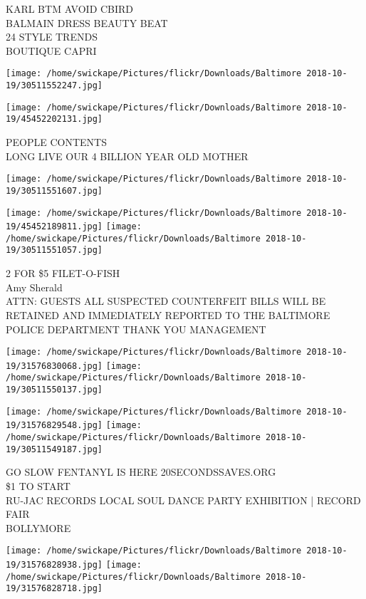 \documentclass[10pt,letterpaper]{article}
\begin{document}
KARL BTM AVOID CBIRD\\
BALMAIN DRESS BEAUTY BEAT\\
24 STYLE TRENDS\\
BOUTIQUE CAPRI\\
\pagebreak

\texttt{[image: /home/swickape/Pictures/flickr/Downloads/Baltimore 2018-10-19/30511552247.jpg]}

\vspace{0.25in}
\texttt{[image: /home/swickape/Pictures/flickr/Downloads/Baltimore 2018-10-19/45452202131.jpg]}

PEOPLE CONTENTS\\
LONG LIVE OUR 4 BILLION YEAR OLD MOTHER\\
\pagebreak

\texttt{[image: /home/swickape/Pictures/flickr/Downloads/Baltimore 2018-10-19/30511551607.jpg]}

\vspace{0.25in}
\texttt{[image: /home/swickape/Pictures/flickr/Downloads/Baltimore 2018-10-19/45452189811.jpg]}
\texttt{[image: /home/swickape/Pictures/flickr/Downloads/Baltimore 2018-10-19/30511551057.jpg]}

2 FOR \$5 FILET{-}O{-}FISH\\
Amy Sherald\\
ATTN: GUESTS ALL SUSPECTED COUNTERFEIT BILLS WILL BE RETAINED AND IMMEDIATELY REPORTED TO THE BALTIMORE POLICE DEPARTMENT THANK YOU MANAGEMENT\\
\pagebreak

\texttt{[image: /home/swickape/Pictures/flickr/Downloads/Baltimore 2018-10-19/31576830068.jpg]}
\texttt{[image: /home/swickape/Pictures/flickr/Downloads/Baltimore 2018-10-19/30511550137.jpg]}

\texttt{[image: /home/swickape/Pictures/flickr/Downloads/Baltimore 2018-10-19/31576829548.jpg]}
\texttt{[image: /home/swickape/Pictures/flickr/Downloads/Baltimore 2018-10-19/30511549187.jpg]}

GO SLOW FENTANYL IS HERE 20SECONDSSAVES.ORG\\
\$1 TO START\\
RU{-}JAC RECORDS LOCAL SOUL DANCE PARTY EXHIBITION | RECORD FAIR\\
BOLLYMORE\\
\pagebreak

\texttt{[image: /home/swickape/Pictures/flickr/Downloads/Baltimore 2018-10-19/31576828938.jpg]}
\texttt{[image: /home/swickape/Pictures/flickr/Downloads/Baltimore 2018-10-19/31576828718.jpg]}
\end{document}
